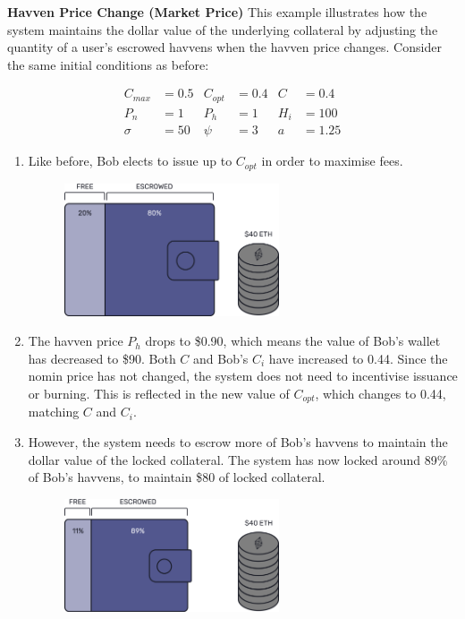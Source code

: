 \newpage

\noindent \textbf{Havven Price Change (Market Price)} This example
illustrates how the system maintains the dollar value of the underlying
collateral by adjusting the quantity of a user's escrowed havvens when the
havven price changes. Consider the same initial conditions as before:

\begin{align*}
C_{max} &= 0.5 & C_{opt} &= 0.4 & C &= 0.4 \\
P_n &= 1 & P_h &= 1 & H_i &= 100 \\
\sigma &= 50 & \psi &= 3 & a&= 1.25
\end{align*}

\begin{enumerate}
\item{Like before, Bob elects to issue up to \(C_{opt}\) in order to maximise fees.}
\begin{figure}[h!]
    \centering
    \includegraphics[width=0.6\textwidth]{img/escrowed}
\end{figure}
\item{The havven price \(P_h\) drops to \$0.90, which means the value of Bob's wallet has decreased to \$90. Both \(C\) and Bob's \(C_i\) have increased to 0.44. Since the nomin price has not changed, the system does not need to incentivise issuance or burning. This is reflected in the new value of \(C_{opt}\), which changes to 0.44, matching \(C\) and \(C_i\). }
\item{However, the system needs to escrow more of Bob's havvens to maintain the dollar value of the locked collateral. The system has now locked around 89\% of Bob's havvens, to maintain \$80 of locked collateral.}
\begin{figure}[h!]
    \centering
    \includegraphics[width=0.6\textwidth]{img/ph_drop}
\end{figure}
\end{enumerate} 
